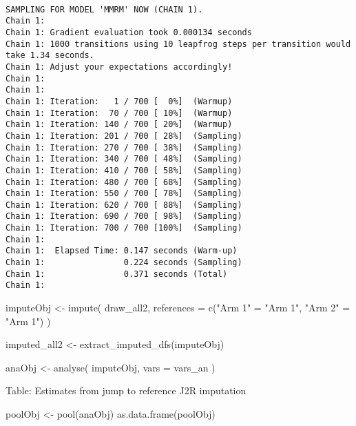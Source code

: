 \documentclass[
  letterpaper,
  DIV=11,
  numbers=noendperiod]{scrreprt}
\newenvironment{Shaded}{\begin{snugshade}}{\end{snugshade}}
\newcommand{\AttributeTok}[1]{\textcolor[rgb]{0.40,0.45,0.13}{#1}}
\newcommand{\FunctionTok}[1]{\textcolor[rgb]{0.28,0.35,0.67}{#1}}
\newcommand{\NormalTok}[1]{\textcolor[rgb]{0.00,0.23,0.31}{#1}}
\newcommand{\OtherTok}[1]{\textcolor[rgb]{0.00,0.23,0.31}{#1}}
\newcommand{\StringTok}[1]{\textcolor[rgb]{0.13,0.47,0.30}{#1}}
\begin{document}
\begin{verbatim}

SAMPLING FOR MODEL 'MMRM' NOW (CHAIN 1).
Chain 1: 
Chain 1: Gradient evaluation took 0.000134 seconds
Chain 1: 1000 transitions using 10 leapfrog steps per transition would take 1.34 seconds.
Chain 1: Adjust your expectations accordingly!
Chain 1: 
Chain 1: 
Chain 1: Iteration:   1 / 700 [  0%]  (Warmup)
Chain 1: Iteration:  70 / 700 [ 10%]  (Warmup)
Chain 1: Iteration: 140 / 700 [ 20%]  (Warmup)
Chain 1: Iteration: 201 / 700 [ 28%]  (Sampling)
Chain 1: Iteration: 270 / 700 [ 38%]  (Sampling)
Chain 1: Iteration: 340 / 700 [ 48%]  (Sampling)
Chain 1: Iteration: 410 / 700 [ 58%]  (Sampling)
Chain 1: Iteration: 480 / 700 [ 68%]  (Sampling)
Chain 1: Iteration: 550 / 700 [ 78%]  (Sampling)
Chain 1: Iteration: 620 / 700 [ 88%]  (Sampling)
Chain 1: Iteration: 690 / 700 [ 98%]  (Sampling)
Chain 1: Iteration: 700 / 700 [100%]  (Sampling)
Chain 1: 
Chain 1:  Elapsed Time: 0.147 seconds (Warm-up)
Chain 1:                0.224 seconds (Sampling)
Chain 1:                0.371 seconds (Total)
Chain 1: 
\end{verbatim}

\begin{Shaded}
\begin{Highlighting}[]
\NormalTok{imputeObj }\OtherTok{\textless{}{-}} \FunctionTok{impute}\NormalTok{(}
\NormalTok{  draw\_all2,}
  \AttributeTok{references =} \FunctionTok{c}\NormalTok{(}\StringTok{"Arm 1"} \OtherTok{=} \StringTok{"Arm 1"}\NormalTok{, }\StringTok{"Arm 2"} \OtherTok{=} \StringTok{"Arm 1"}\NormalTok{)}
\NormalTok{)}

\NormalTok{imputed\_all2 }\OtherTok{\textless{}{-}} \FunctionTok{extract\_imputed\_dfs}\NormalTok{(imputeObj)}

\NormalTok{anaObj }\OtherTok{\textless{}{-}} \FunctionTok{analyse}\NormalTok{(}
\NormalTok{  imputeObj,}
  \AttributeTok{vars =}\NormalTok{ vars\_an}
\NormalTok{)}
\end{Highlighting}
\end{Shaded}

Table: Estimates from jump to reference J2R imputation

\begin{Shaded}
\begin{Highlighting}[]
\NormalTok{poolObj }\OtherTok{\textless{}{-}} \FunctionTok{pool}\NormalTok{(anaObj)}
\FunctionTok{as.data.frame}\NormalTok{(poolObj)}
\end{Highlighting}
\end{Shaded}
\end{document}
